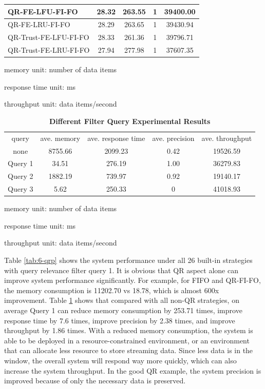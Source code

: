 \begin{table}[!htbp]
\begin{tabular}{|l||c|c|c|c|}
QR-FE-LFU-FI-FO      & 28.32 & 263.55 & 1 & 39400.00\\ \hline 
QR-FE-LRU-FI-FO      & 28.29 & 263.65 & 1 & 39430.94\\ \hline 
QR-Trust-FE-LFU-FI-FO & 28.33 & 261.36 & 1 & 39796.71\\ \hline 
QR-Trust-FE-LRU-FI-FO & 27.94 & 277.98 & 1 & 37607.35\\ \hline 
    \end{tabular}
    \begin{tablenotes}
 		\item memory unit: number of data items
 		\item response time unit: ms
 		\item throughput unit: data items/second
    \end{tablenotes}
\end{table}

\begin{table}[!htbp]
	\centering
    \caption{\textbf{Different Filter Query Experimental Results}}
    \label{tab:6-fqqi}
    \begin{tabular}{|c||c|c|c|c|} \hline
    query & ave. memory & ave. response time & ave. precision & ave. throughput \\ \hhline{|=#=|=|=|=|}
    none & 8755.66 & 2099.23 & 0.42 & 19526.59 \\ \hline
    Query 1 & 34.51 & 276.19 & 1.00 & 36279.83\\ \hline
    Query 2 & 1882.19 & 739.97 & 0.92 & 19140.17\\ \hline
    Query 3 & 5.62 & 250.33 & 0 & 41018.93\\ \hline
    \end{tabular}
    \begin{tablenotes}
 		\item memory unit: number of data items
 		\item response time unit: ms
 		\item throughput unit: data items/second
    \end{tablenotes}
\end{table}

Table \ref{tab:6-qrp} shows the system performance under all 26 built-in strategies with query relevance filter query 1.
It is obvious that QR aspect alone can improve system performance significantly. 
For example, for FIFO and QR-FI-FO, the memory consumption is 11202.70 vs 18.78, which is almost 600x improvement. 
Table \ref{tab:6-fqqi} shows that compared with all non-QR strategies, on average Query 1 can reduce memory consumption by 253.71 times, improve response time by 7.6 times, improve precision by 2.38 times, and improve throughput by 1.86 times. 
With a reduced memory consumption, the system is able to be deployed in a resource-constrained environment, or an environment that can allocate less resource to store streaming data. 
Since less data is in the window, the overall system will respond way more quickly, which can also increase the system throughput. 
In the good QR example, the system precision is improved because of only the necessary data is preserved. 

